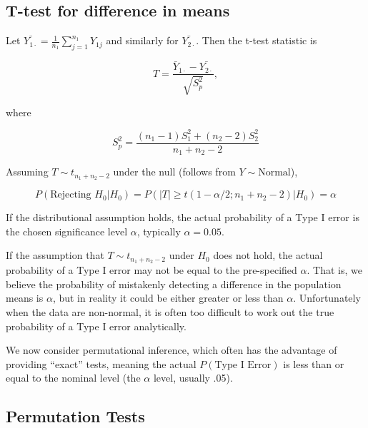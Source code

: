 \documentclass[
  letterpaper,
  DIV=11,
  numbers=noendperiod]{scrreport}
\begin{document}
\hypertarget{t-test-for-difference-in-means}{%
\subsection{T-test for difference in
means}\label{t-test-for-difference-in-means}}

Let \(\bar{Y_{1\cdot}} = \frac{1}{n_1} \sum_{j=1}^{n_1} Y_{1j}\) and
similarly for \(\bar{Y_{2\cdot}}\). Then the t-test statistic is

\[
T = \frac{\bar Y_{1 \cdot} - \bar{Y_{2 \cdot}}}{\sqrt{S_p^2}},
\]

where

\[
S_p^2 = \frac{(n_1 - 1)S_1^2 + (n_2-2)S_2^2}{n_1 + n_2 - 2}
\]

Assuming \(T \sim t_{n_1 + n_2 - 2}\) under the null (follows from
\(Y \sim \text{Normal}\)),

\[
P(\text{Rejecting }  H_0 | H_0) = P(|T| \geq t(1-\alpha/2; n_1 + n_2 - 2) | H_0) = \alpha
\]

If the distributional assumption holds, the actual probability of a Type
I error is the chosen significance level \(\alpha\), typically
\(\alpha = 0.05.\)

If the assumption that \(T \sim t_{n_1 + n_2 - 2}\) under \(H_0\) does
not hold, the actual probability of a Type I error may not be equal to
the pre-specified \(\alpha\). That is, we believe the probability of
mistakenly detecting a difference in the population means is \(\alpha\),
but in reality it could be either greater or less than \(\alpha\).
Unfortunately when the data are non-normal, it is often too difficult to
work out the true probability of a Type I error analytically.

We now consider permutational inference, which often has the advantage
of providing ``exact'' tests, meaning the actual
\(P(\text{Type I Error})\) is less than or equal to the nominal level
(the \(\alpha\) level, usually .05).

\hypertarget{permutation-tests}{%
\subsection{Permutation Tests}\label{permutation-tests}}
\end{document}
